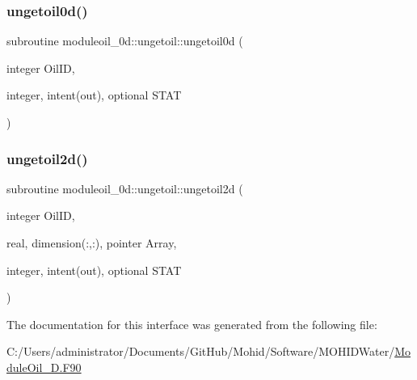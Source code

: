 \subsubsection{\texorpdfstring{ungetoil0d()}{ungetoil0d()}}
{\footnotesize\ttfamily subroutine moduleoil\+\_\+0d\+::ungetoil\+::ungetoil0d (\begin{DoxyParamCaption}\item[{integer}]{Oil\+ID,  }\item[{integer, intent(out), optional}]{S\+T\+AT }\end{DoxyParamCaption})\hspace{0.3cm}{\ttfamily [private]}}

\mbox{\label{interfacemoduleoil__0d_1_1ungetoil_adcaec318ceb5457ef272230145efed2f}} 
\subsubsection{\texorpdfstring{ungetoil2d()}{ungetoil2d()}}
{\footnotesize\ttfamily subroutine moduleoil\+\_\+0d\+::ungetoil\+::ungetoil2d (\begin{DoxyParamCaption}\item[{integer}]{Oil\+ID,  }\item[{real, dimension(\+:,\+:), pointer}]{Array,  }\item[{integer, intent(out), optional}]{S\+T\+AT }\end{DoxyParamCaption})\hspace{0.3cm}{\ttfamily [private]}}



The documentation for this interface was generated from the following file\+:\begin{DoxyCompactItemize}
\item 
C\+:/\+Users/administrator/\+Documents/\+Git\+Hub/\+Mohid/\+Software/\+M\+O\+H\+I\+D\+Water/\mbox{\hyperlink{_module_oil__0_d_8_f90}{Module\+Oil\+\_\+D.\+F90}}\end{DoxyCompactItemize}
